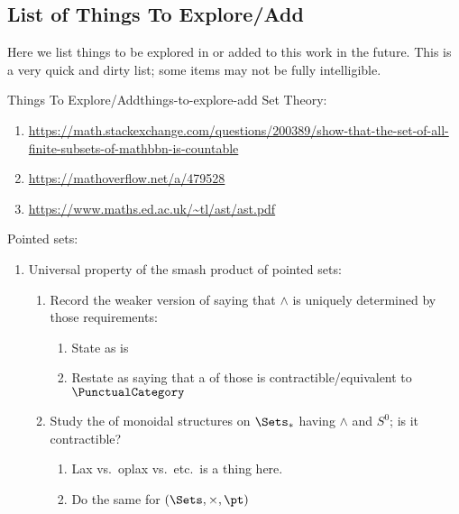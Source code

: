 \subsection{List of Things To Explore/Add}\label{subsection-things-to-explore-add}
Here we list things to be explored in or added to this work in the future. This is a very quick and dirty list; some items may not be fully intelligible.
\begin{remark}{Things To Explore/Add}{things-to-explore-add}%
    Set Theory:
    \begin{enumerate}
        \item \url{https://math.stackexchange.com/questions/200389/show-that-the-set-of-all-finite-subsets-of-mathbbn-is-countable}
        \item \url{https://mathoverflow.net/a/479528}
        \item \url{https://www.maths.ed.ac.uk/~tl/ast/ast.pdf}
    \end{enumerate}
    Pointed sets:
    \begin{enumerate}
        \item Universal property of the smash product of pointed sets:
            \begin{enumerate}
                \item Record the weaker version of  saying that $\wedge$ is uniquely determined by those requirements:
                    \begin{enumerate}
                        \item State as is
                        \item Restate as saying that a  of those is contractible/equivalent to $\PunctualCategory$
                    \end{enumerate}
                \item Study the  of monoidal structures on $\Sets_{*}$ having $\wedge$ and $S^{0}$; is it contractible?
                    \begin{enumerate}
                        \item Lax vs.\ oplax vs.\ etc.\ is a thing here.
                        \item Do the same for $(\Sets,\times,\pt)$
                    \end{enumerate}

\end{enumerate}
\end{enumerate}
\end{remark}
